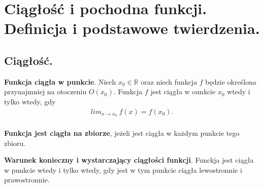\documentclass[12pt]{article}
\begin{document}
    \section{Ciągłość i pochodna funkcji. Definicja i podstawowe twierdzenia.}

    \subsection{Ciągłość.}

    \begin{definition}
        \textbf{Funkcja ciągła w punkcie}. Niech $x_0 \in \mathbb{R}$ oraz niech funkcja $f$ będzie określona przynajmniej
        na otoczeniu $O(x_0)$. Funkcja $f$ jest ciągła w ounkcie $x_0$ wtedy i tylko wtedy, gdy
        \begin{align*}
            lim_{x \rightarrow x_0} ~ f(x) = f(x_0).
        \end{align*}
        \hfill \\

        \textbf{Funkcja jest ciągła na zbiorze}, jeżeli jest ciągła w każdym punkcie tego zbioru.
    \end{definition}

    \begin{theorem}
        \textbf{Warunek konieczny i wystarczający ciągłości funkcji}. Funckja jest ciągła w punkcie wtedy i tylko wtedy,
        gdy jest w tym punkcie ciągła lewostronnie i prawostronnie.
    \end{theorem}
\end{document}
